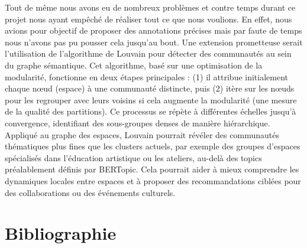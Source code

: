 \documentclass[mstat,12pt]{unswthesis}
\begin{document}
Tout de même nous avons eu de nombreux problèmes et contre temps durant ce projet nous ayant empêché de réaliser tout ce que nous voulions. En effet, nous avions pour objectif de proposer des annotations précises mais par faute de temps nous n'avons pas pu pousser cela jusqu'au bout.
Une extension prometteuse serait l’utilisation de l’algorithme de Louvain pour détecter des communautés au sein du graphe sémantique. Cet algorithme, basé sur une optimisation de la modularité, fonctionne en deux étapes principales : (1) il attribue initialement chaque nœud (espace) à une communauté distincte, puis (2) itère sur les nœuds pour les regrouper avec leurs voisins si cela augmente la modularité (une mesure de la qualité des partitions). Ce processus se répète à différentes échelles jusqu’à convergence, identifiant des sous-groupes denses de manière hiérarchique. Appliqué au graphe des espaces, Louvain pourrait révéler des communautés thématiques plus fines que les clusters actuels, par exemple des groupes d’espaces spécialisés dans l’éducation artistique ou les ateliers, au-delà des topics préalablement définis par BERTopic. Cela pourrait aider à mieux comprendre les dynamiques locales entre espaces et à proposer des recommandations ciblées pour des collaborations ou des événements culturels.

\bigskip

\hypertarget{bibliographie}{%
\chapter*{Bibliographie}\label{bibliographie}}
\end{document}
